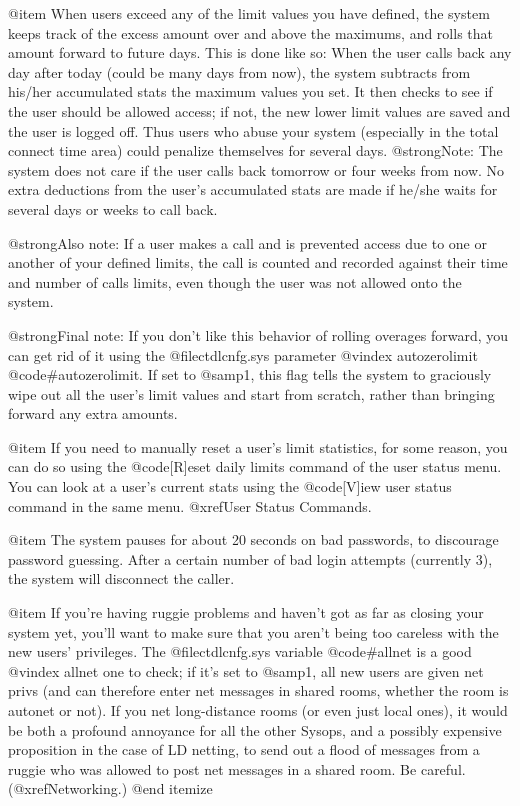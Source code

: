 @item
When users exceed any of the limit values you have defined,
the system keeps track of the excess amount over and above
the maximums, and rolls that amount forward to future days.
This is done like so:  When the user calls back any day after
today (could be many days from now), the system subtracts from
his/her accumulated stats the maximum values you set.  It then
checks to see if the user should be allowed access; if not,
the new lower limit values are saved and the user is logged off.
Thus users who abuse your system (especially in the total
connect time area) could penalize themselves for several days.
@strong{Note:}  The system does not care if the user calls back tomorrow
or four weeks from now.  No extra deductions from the user's
accumulated stats are made if he/she waits for several days or
weeks to call back.

@strong{Also note:}  If a user makes a call and is prevented access due
to one or another of your defined limits, the call is counted
and recorded against their time and number of calls limits,
even though the user was not allowed onto the system.

@strong{Final note:}  If you don't like this behavior of rolling overages
forward, you can get rid of it using the @file{ctdlcnfg.sys} parameter
@vindex autozerolimit
@code{#autozerolimit}.  If set to @samp{1}, this flag tells the system to
graciously wipe out all the user's limit values and start from
scratch, rather than bringing forward any extra amounts.

@item
If you need to manually reset a user's limit statistics, for
some reason, you can do so using the @code{[R]eset} daily limits
command of the user status menu.  You can look at a user's
current stats using the @code{[V]iew user status} command in the
same menu.  @xref{User Status Commands}.

@item
The system pauses for about 20 seconds on bad passwords, to
discourage password guessing.  After a certain number of bad
login attempts (currently 3), the system will disconnect the
caller.

@item
If you're having ruggie problems and haven't got as far
as closing your system yet, you'll want to make sure that
you aren't being too careless with the new users'
privileges.  The @file{ctdlcnfg.sys} variable @code{#allnet} is a good
@vindex allnet
one to check; if it's set to @samp{1}, all new users are given
net privs (and can therefore enter net messages in shared
rooms, whether the room is autonet or not).  If you net
long-distance rooms (or even just local ones), it would
be both a profound annoyance for all the other Sysops,
and a possibly expensive proposition in the case of LD
netting, to send out a flood of messages from a ruggie
who was allowed to post net messages in a shared room.
Be careful.  (@xref{Networking}.)
@end itemize
